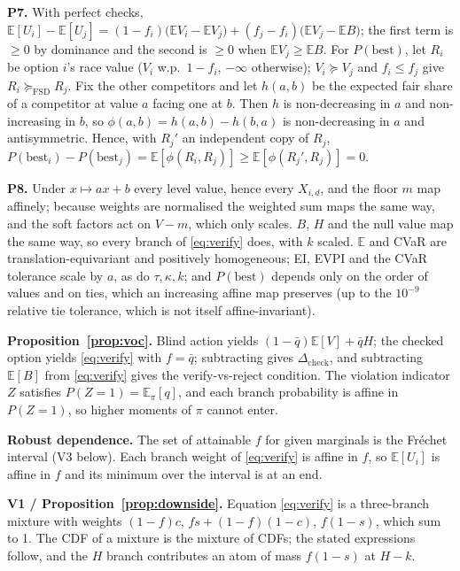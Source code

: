 \documentclass[11pt]{article}
\theoremstyle{definition}
\begin{document}
\textbf{P7.} With perfect checks,
$\mathbb E[U_i]-\mathbb E[U_j]=(1-f_i)\bigl(\mathbb E V_i-\mathbb E V_j\bigr)+(f_j-f_i)\bigl(\mathbb E
V_j-\mathbb E B\bigr)$; the first term is $\ge0$ by dominance and the second is $\ge0$ when
$\mathbb E V_j\ge\mathbb E B$. For $P(\mathrm{best})$, let $R_i$ be option $i$'s race value ($V_i$
w.p.\ $1-f_i$, $-\infty$ otherwise); $V_i\succeq V_j$ and $f_i\le f_j$ give
$R_i\succeq_{\mathrm{FSD}}R_j$. Fix the other competitors and let $h(a,b)$ be the expected fair share
of a competitor at value $a$ facing one at $b$. Then $h$ is non-decreasing in $a$ and non-increasing
in $b$, so $\phi(a,b)=h(a,b)-h(b,a)$ is non-decreasing in $a$ and antisymmetric. Hence, with $R_j'$ an
independent copy of $R_j$,
$P(\mathrm{best}_i)-P(\mathrm{best}_j)=\mathbb E[\phi(R_i,R_j)]\ge\mathbb E[\phi(R_j',R_j)]=0$.

\textbf{P8.} Under $x\mapsto ax+b$ every level value, hence every $X_{i,d}$, and the floor $m$ map
affinely; because weights are normalised the weighted sum maps the same way, and the soft factors act
on $V-m$, which only scales. $B$, $H$ and the null value map the same way, so every branch of
\eqref{eq:verify} does, with $k$ scaled. $\mathbb E$ and CVaR are translation-equivariant and
positively homogeneous; EI, EVPI and the CVaR tolerance scale by $a$, as do $\tau,\kappa,k$; and
$P(\mathrm{best})$ depends only on the order of values and on ties, which an increasing affine map
preserves (up to the $10^{-9}$ relative tie tolerance, which is not itself affine-invariant).

\textbf{Proposition~\ref{prop:voc}.} Blind action yields $(1-\bar q)\mathbb E[V]+\bar qH$; the
checked option yields \eqref{eq:verify} with $f=\bar q$; subtracting gives $\Delta_{\text{check}}$,
and subtracting $\mathbb E[B]$ from \eqref{eq:verify} gives the verify-vs-reject condition. The
violation indicator $Z$ satisfies $P(Z=1)=\mathbb E_\pi[q]$, and each branch probability is affine
in $P(Z=1)$, so higher moments of $\pi$ cannot enter.

\textbf{Robust dependence.} The set of attainable $f$ for given marginals is the Fr\'echet interval
(V3 below). Each branch weight of \eqref{eq:verify} is affine in $f$, so $\mathbb E[U_i]$ is affine
in $f$ and its minimum over the interval is at an end.

\textbf{V1 / Proposition~\ref{prop:downside}.} Equation \eqref{eq:verify} is a three-branch mixture
with weights $(1-f)c$, $fs+(1-f)(1-c)$, $f(1-s)$, which sum to 1. The CDF of a mixture is the
mixture of CDFs; the stated expressions follow, and the $H$ branch contributes an atom of mass
$f(1-s)$ at $H-k$.
\end{document}
